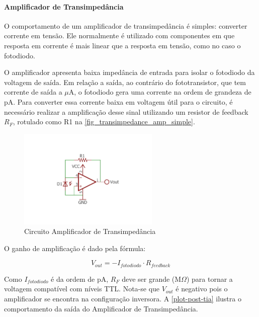 	\paragraph{Amplificador de Transimpedância}
	
	O comportamento de um amplificador de transimpedância é simples: converter corrente em tensão. Ele normalmente é utilizado com componentes em que resposta em corrente é mais linear que a resposta em tensão, como no caso o fotodiodo. 
	
	O amplificador apresenta baixa impedância de entrada para isolar o fotodiodo da voltagem de saída. Em relação a saída, ao contrário do fototransistor, que tem corrente de saída a $\mu$A, o fotodiodo gera uma corrente na ordem de grandeza de pA. Para converter essa corrente baixa em voltagem útil para o circuito, é necessário realizar a amplificação desse sinal utilizando um resistor de feedback $R_{F}$, rotulado como R1 na \autoref{fig_transimpedance_amp_simple}.
	
	\begin{figure}[htb]
		\caption{\label{fig_transimpedance_amp_simple} Circuito Amplificador de Transimpedância}
		\centering
		\includegraphics[width=0.6\textwidth, trim={2cm 3.8cm 2cm 3.8cm}, clip]{circuits/transimpedance_amp_simple.pdf}
	\end{figure}
	
	O ganho de amplificação é dado pela fórmula:
	
	\begin{equation}
	V_{out} = - I_{fotodiodo} \cdot R_{feedback}
	\end{equation}
	
	Como $I_{fotodiodo}$ é da ordem de pA, $R_{F}$ deve ser grande (M$\Omega$) para tornar a voltagem compatível com níveis TTL. Nota-se que $V_{out}$ é negativo pois o amplificador se encontra na configuração inversora. A \autoref{plot-post-tia} ilustra o comportamento da saída do Amplificador de Transimpedância.
	
